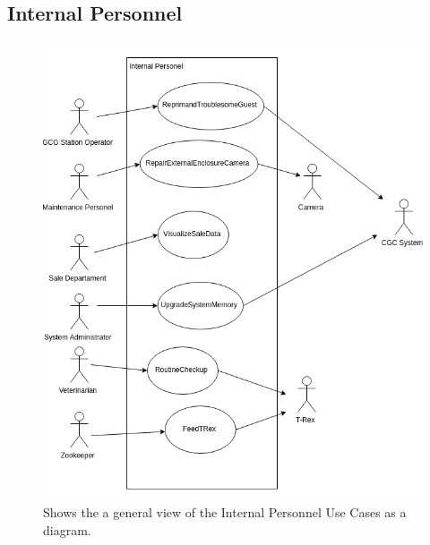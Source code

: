 \documentclass[12pt]{article}
\begin{document}
\subsection{Internal Personnel}
\begin{figure}[H]
    \centerline{\includegraphics[scale=.30]{Use_Cases__Internal.png}}
    \caption{Shows the a general view of the Internal Personnel Use Cases as a diagram.}
    \label{fig:usecaseinternal}
\end{figure}    
\end{document}
